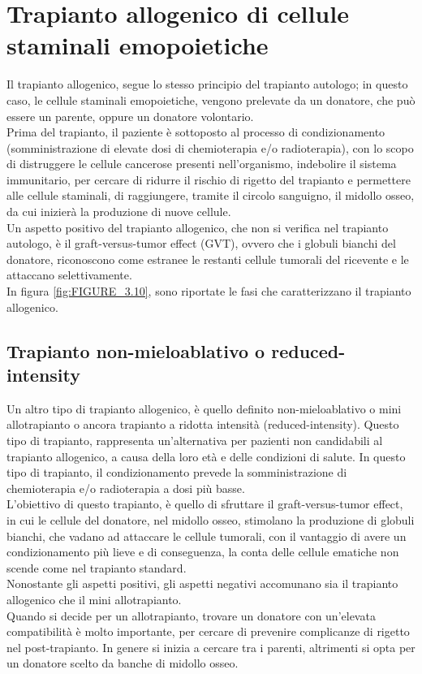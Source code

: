 \section{Trapianto allogenico di cellule staminali emopoietiche}

Il trapianto allogenico, segue lo stesso principio del trapianto autologo; in questo caso, le cellule staminali emopoietiche, 
vengono prelevate da un donatore, che può essere un parente, oppure un donatore volontario\cite{LLSBLOOD}.\\ 
Prima del trapianto, il paziente è sottoposto al processo di condizionamento (somministrazione di elevate dosi di 
chemioterapia e/o radioterapia), con lo scopo di distruggere le cellule cancerose presenti nell’organismo, 
indebolire il sistema immunitario, per cercare di ridurre il rischio di rigetto del trapianto e permettere alle 
cellule staminali, di raggiungere, tramite il circolo sanguigno, il midollo osseo, da cui inizierà la produzione 
di nuove cellule\cite{LLSBLOOD}.\\
Un aspetto positivo del trapianto allogenico, che non si verifica nel trapianto autologo, è il graft-versus-tumor 
effect (GVT), ovvero che i globuli bianchi del donatore, riconoscono come estranee le restanti cellule tumorali 
del ricevente e le attaccano selettivamente\cite{LLSBLOOD}.\\ In figura \ref{fig:FIGURE_3.10}, 
sono riportate le fasi che caratterizzano il trapianto allogenico.

\subsection{Trapianto non-mieloablativo o reduced-intensity}

Un altro tipo di trapianto allogenico, è quello definito non-mieloablativo o mini allotrapianto o ancora trapianto a 
ridotta intensità (reduced-intensity). Questo tipo di trapianto, rappresenta un’alternativa per pazienti non 
candidabili al trapianto allogenico, a causa della loro età e delle condizioni di salute. In questo tipo di trapianto, 
il condizionamento prevede la somministrazione di chemioterapia e/o radioterapia a dosi più basse\cite{LLSBLOOD}.\\
L’obiettivo di questo trapianto, è quello di sfruttare il graft-versus-tumor effect, in cui le cellule del donatore, 
nel midollo osseo, stimolano la produzione di globuli bianchi, che vadano ad attaccare le cellule tumorali, con il 
vantaggio di avere un condizionamento più lieve e di conseguenza, la conta delle cellule ematiche 
non scende come nel trapianto standard\cite{STEMCELLS}.\\
Nonostante gli aspetti positivi, gli aspetti negativi accomunano sia il trapianto allogenico che il mini allotrapianto.\\
Quando si decide per un allotrapianto, trovare un donatore con un’elevata compatibilità è molto importante, 
per cercare di prevenire complicanze di rigetto nel post-trapianto. In genere si inizia a cercare tra i parenti, 
altrimenti si opta per un donatore scelto da banche di midollo osseo\cite{TRAPIANTO}.

